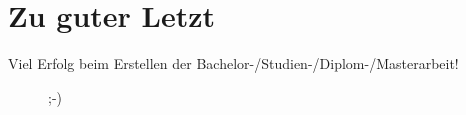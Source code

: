 \chapter{Zu guter Letzt}
\label{chap:zuguterletzt}
Viel Erfolg beim Erstellen der Bachelor-/Studien-/Diplom-/Masterarbeit!
\begin{figure}[h!]
\caption{;-)}
\label{abb:pvsrpm}
\end{figure}
